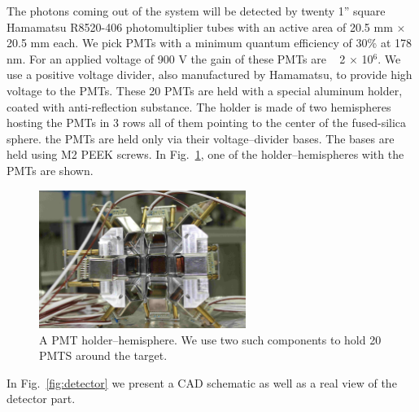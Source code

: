 The photons coming out of the system will be detected by twenty 1'' square Hamamatsu R8520-406 photomultiplier 
tubes with an active area of 20.5 mm $\times$ 20.5 mm each. We pick PMTs with a minimum quantum efficiency of 30\% 
at 178 nm. For an applied voltage of 900 V the gain of these PMTs are ~ 2 $\times$ 10$^6$. We use a positive 
voltage divider, also manufactured by Hamamatsu, to provide high voltage to the PMTs.
These 20 PMTs are held with a special aluminum holder, coated with anti-reflection substance. The holder is made of two hemispheres hosting the PMTs in 
3 rows all of them pointing to the center of the fused-silica sphere. the PMTs are held only via their voltage--divider bases. 
The bases are held using M2 PEEK screws. 
In Fig.~\ref{fig:pmtholder}, one of the holder--hemispheres with the PMTs are shown.

\begin{figure}
   \centering
   \includegraphics[width=0.6\textwidth]{PMTholder.JPG}
   \caption{A PMT holder--hemisphere. We use two such components to hold 20 PMTS around the target.} 
   \label{fig:pmtholder}
\end{figure}


In Fig.~\ref{fig:detector} we present a CAD schematic as well as a real view of the detector part.

